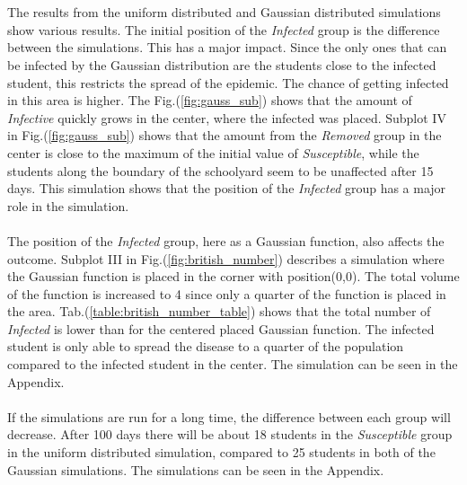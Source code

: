 \documentclass[%
twoside,                 %
final,                   %
chapterprefix=true,      %
open=right               %
10pt]{book}
\begin{document}
\\
\\
The results from the uniform distributed and Gaussian distributed simulations show various results. The initial position of the \emph{Infected} group is the difference between the simulations. This has a major impact. Since the only ones that can be infected by the Gaussian distribution are the students close to the infected student, this restricts the spread of the epidemic. The chance of getting infected in this area is higher. The Fig.(\ref{fig:gauss_sub}) shows that the amount of \emph{Infective} quickly grows in the center, where the infected was placed. Subplot IV in Fig.(\ref{fig:gauss_sub}) shows that the amount from the \emph{Removed} group in the center is close to the maximum of the initial value of \emph{Susceptible}, while the students along the boundary of the schoolyard seem to be unaffected after 15 days. This simulation shows that the position of the \emph{Infected} group has a major role in the simulation.
\\
\\
The position of the \emph{Infected} group, here as a Gaussian function, also affects the outcome. Subplot III in Fig.(\ref{fig:british_number}) describes a simulation where the Gaussian function is placed in the corner with position(0,0). The total volume of the function is increased to 4 since only a quarter of the function is placed in the area. Tab.(\ref{table:british_number_table}) shows that the total number of \emph{Infected} is lower than for the centered placed Gaussian function. The infected student is only able to spread the disease to a quarter of the population compared to the infected student in the center. The simulation can be seen in the Appendix.
\\
\\
If the simulations are run for a long time, the difference between each group will decrease. After 100 days there will be about 18 students in the \emph{Susceptible} group in the uniform distributed simulation, compared to 25 students in both of the Gaussian simulations. The simulations can be seen in the Appendix.

\end{document}
